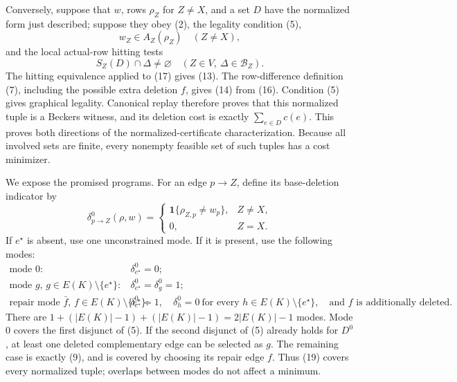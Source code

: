 Conversely, suppose that \(w\), rows \(\rho_Z\) for \(Z\ne X\), and a set \(D\) have the normalized form just described; suppose they obey (2), the legality condition (5),
\[
 w_Z\in A_Z(\rho_Z)\quad(Z\ne X),                                   \tag{16}
\]
and the local actual-row hitting tests
\[
 S_Z(D)\cap\Delta\ne\varnothing
 \quad(Z\in V,\ \Delta\in\mathcal B_Z).                            \tag{17}
\]
The hitting equivalence applied to (17) gives (13).  The row-difference definition (7), including the possible extra deletion \(f\), gives (14) from (16).  Condition (5) gives graphical legality.  Canonical replay therefore proves that this normalized tuple is a Beckers witness, and its deletion cost is exactly \(\sum_{e\in D}c(e)\).  This proves both directions of the normalized-certificate characterization.  Because all involved sets are finite, every nonempty feasible set of such tuples has a cost minimizer.

We expose the promised programs.  For an edge \(p\to Z\), define its base-deletion indicator by
\[
 \delta^0_{p\to Z}(\rho,w)
 =
 \begin{cases}
  \mathbf 1\{\rho_{Z,p}\ne w_p\},&Z\ne X,\\
  0,&Z=X.
 \end{cases}                                                          \tag{18}
\]
If \(e^\star\) is absent, use one unconstrained mode.  If it is present, use the following modes:
\[
\begin{array}{ll}
\text{mode \(0\):}&\delta^0_{e^\star}=0;\\[2pt]
\text{mode \(g\), \(g\in E(K)\setminus\{e^\star\}\):}
 &\delta^0_{e^\star}=\delta^0_g=1;\\[2pt]
\text{repair mode \(\bar f\), \(f\in E(K)\setminus\{e^\star\}\):}
 &\delta^0_{e^\star}=1,\quad
   \delta^0_h=0\ \text{for every }h\in E(K)\setminus\{e^\star\},
   \quad\text{and }f\text{ is additionally deleted.}
\end{array}                                                            \tag{19}
\]
There are \(1+(|E(K)|-1)+(|E(K)|-1)=2|E(K)|-1\) modes.  Mode \(0\) covers the first disjunct of (5).  If the second disjunct of (5) already holds for \(D^0\), at least one deleted complementary edge can be selected as \(g\).  The remaining case is exactly (9), and is covered by choosing its repair edge \(f\).  Thus (19) covers every normalized tuple; overlaps between modes do not affect a minimum.

